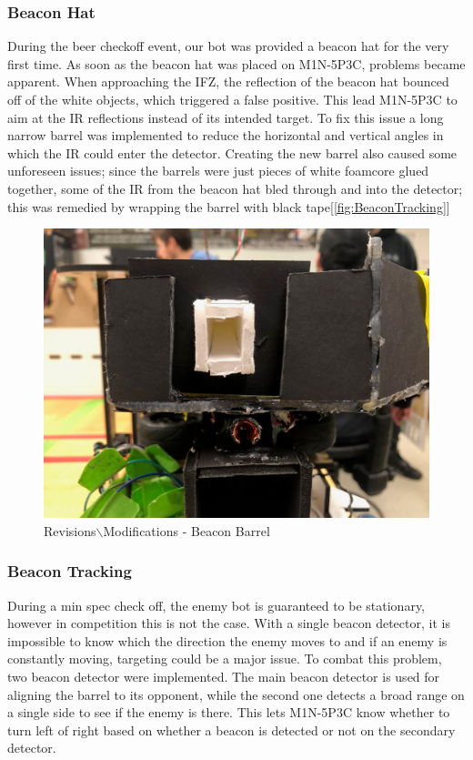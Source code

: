 \documentclass{article}
\begin{document}
\subsubsection{Beacon Hat}
During the beer checkoff event, our bot was provided a beacon hat for the very first time. As soon as the beacon hat was placed on M1N-5P3C, problems became apparent. When approaching the IFZ, the reflection of the beacon hat bounced off of the white objects, which triggered a false positive. This lead M1N-5P3C to aim at the IR reflections instead of its intended target. To fix this issue a long narrow barrel was implemented to reduce the horizontal and vertical angles in which the IR could enter the detector. Creating the new barrel also caused some unforeseen issues; since the barrels were just pieces of white foamcore glued together, some of the IR from the beacon hat bled through and into the detector; this was remedied by wrapping the barrel with black tape[\ref{fig:BeaconTracking}]

\begin{figure}[H]
    \centering
    \includegraphics[width = 6in]{BeaconHat.JPG}
    \caption{Revisions$\backslash{}$Modifications - Beacon Barrel}
    \label{fig:BeaconHat}
\end{figure}

\subsubsection{Beacon Tracking}
During a min spec check off, the enemy bot is guaranteed to be stationary, however in competition this is not the case. With a single beacon detector, it is impossible to know which the direction the enemy moves to and if an enemy is constantly moving, targeting could be a major issue. To combat this problem, two beacon detector were implemented. The main beacon detector is used for aligning the barrel to its opponent, while the second one detects a broad range on a single side to see if the enemy is there. This lets M1N-5P3C know whether to turn left of right based on whether a beacon is detected or not on the secondary detector.
\end{document}
